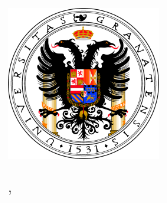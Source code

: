 \begin{titlepage}
    \begin{addmargin}[-1cm]{-3cm}
    \begin{center}
        \large

        \hfill

        \vfill 

        \begingroup
            {\color{Maroon}\spacedallcaps{\myTitle}}

			\small\mySubtitle \medskip  \medskip
            \\ \bigskip
        \endgroup

        \spacedlowsmallcaps{\myName}

        \vfill



		\includegraphics[width=4cm]{gfx/logo_ugr}
	

        \vfill

        \myProf, \myOtherProf \\
        \myUni \\ \bigskip

        \myTime\ %


    \end{center}
  \end{addmargin}
\end{titlepage}

